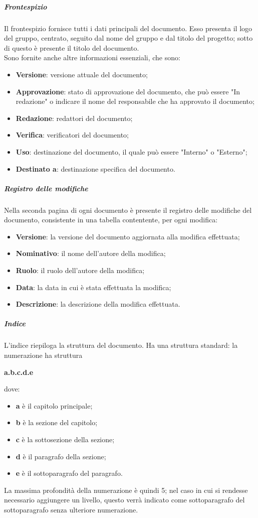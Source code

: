 \documentclass[../norme-di-progetto.tex]{subfiles}
\begin{document}
\subparagraph*{Frontespizio}
Il frontespizio fornisce tutti i dati principali del documento. Esso presenta il logo del gruppo, centrato, seguito dal nome del gruppo e dal titolo del progetto; sotto di questo è presente il titolo del documento. \\
Sono fornite anche altre informazioni essenziali, che sono:
\begin{itemize}
  \item \textbf{Versione}: versione attuale del documento;
  \item \textbf{Approvazione}: stato di approvazione del documento, che può essere "In redazione" o indicare il nome del responsabile che ha approvato il documento;
  \item \textbf{Redazione}: redattori del documento;
  \item \textbf{Verifica}: verificatori del documento;
  \item \textbf{Uso}: destinazione del documento, il quale può essere "Interno" o "Esterno";
  \item \textbf{Destinato a}: destinazione specifica del documento.
\end{itemize}
\subparagraph*{Registro delle modifiche}
Nella seconda pagina di ogni documento è presente il registro delle modifiche del documento, consistente in una tabella contentente, per ogni modifica:
\begin{itemize}
  \item \textbf{Versione}: la versione del documento aggiornata alla modifica effettuata;
  \item \textbf{Nominativo}: il nome dell'autore della modifica;
  \item \textbf{Ruolo}: il ruolo dell'autore della modifica;
  \item \textbf{Data}: la data in cui è stata effettuata la modifica;
  \item \textbf{Descrizione}: la descrizione della modifica effettuata.
\end{itemize}
\subparagraph*{Indice}
L'indice riepiloga la struttura del documento. Ha una struttura standard: la numerazione ha struttura \begin{center}
  \centering
  \textbf{a.b.c.d.e}
\end{center} dove:
\begin{itemize}
  \item \textbf{a} è il capitolo principale;
  \item \textbf{b} è la sezione del capitolo;
  \item \textbf{c} è la sottosezione della sezione;
  \item \textbf{d} è il paragrafo della sezione;
  \item \textbf{e} è il sottoparagrafo del paragrafo.
\end{itemize}
La massima profondità della numerazione è quindi 5; nel caso in cui si rendesse necessario aggiungere un livello, questo verrà indicato come sottoparagrafo del sottoparagrafo senza ulteriore numerazione.
\end{document}
